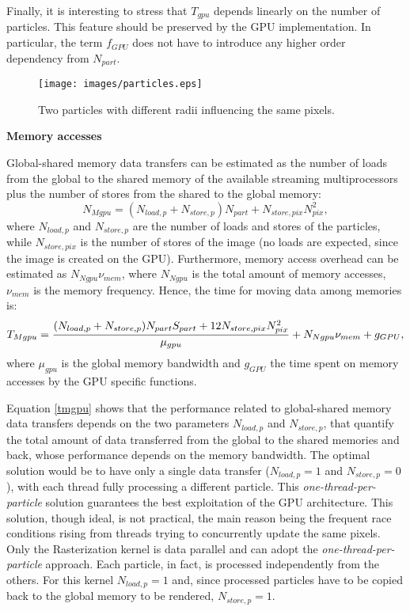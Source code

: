 \documentclass[11pt]{article}
\begin{document}
Finally, it is interesting to stress that $T_{gpu}$ depends linearly on the number of particles. 
This feature should be preserved by the GPU implementation. In particular, the term 
$f_{GPU}$ does not have to introduce any higher order dependency from $N_{part}$. 

\begin{figure}
\centering
\texttt{[image: images/particles.eps]}
\caption{Two particles with different radii influencing the same pixels.}
\label{fig:particles}
\end{figure}


\medskip
\noindent
{\bf Memory accesses}

\noindent
Global-shared memory data transfers can be estimated 
as the number of loads from the global to the shared memory of the available 
streaming multiprocessors plus the number of stores from the shared to the global memory: 
\begin{equation}
N_{Mgpu} = (N_{load,p} + N_{store,p}) N_{part} + N_{store,pix} N_{pix}^2,
\end{equation}
where $N_{load,p}$ and $N_{store,p}$ are the number of loads and stores of the 
particles, while $N_{store,pix}$ is the number of stores of the image (no loads 
are expected, since the image is created on the GPU). 
Furthermore, memory access overhead can be estimated as $N_{Ngpu} \nu_{mem}$,
where $N_{Ngpu}$ is the total amount of memory accesses, $\nu_{mem}$
is the memory frequency. 
Hence, the time for moving data among memories is:
\begin{equation}\label{tmgpu}
T_{Mgpu} = {(N_{load,p} + N_{store,p}) N_{part} S_{part}
+ 12 N_{store,pix} N_{pix}^2\over \mu_{gpu}}
+ N_{Ngpu} \nu_{mem} + g_{GPU},
\end{equation}
where $\mu_{gpu}$ is the global memory bandwidth
and $g_{GPU}$ the time 
spent on memory accesses by the GPU specific
functions. 

Equation \eqref{tmgpu} shows that the performance related to global-shared memory 
data transfers
depends on the two parameters $N_{load,p}$ and $N_{store,p}$, that quantify the
total amount of data transferred from the global to the shared memories 
and back, whose performance depends on the memory bandwidth.
The optimal solution would be to have only a single data transfer
($N_{load,p} = 1$ and $N_{store,p} = 0$), with each thread
fully processing a different particle. This {\it one-thread-per-particle} solution guarantees
the best exploitation of the GPU architecture.
This solution, though ideal, is not practical, the main reason being the frequent race conditions
rising from threads trying to concurrently update the same pixels.
Only the Rasterization kernel is data parallel and can adopt the {\it one-thread-per-particle}
approach. Each particle, in fact, is processed independently from the others. For this kernel
$N_{load,p} = 1$ and, since processed particles
have to be copied back to the global memory to be rendered, $N_{store,p} = 1$.
\end{document}
